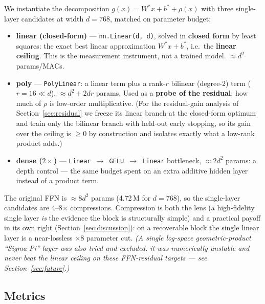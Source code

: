 \documentclass{article}
\begin{document}
We instantiate the decomposition $g(x) = W^{*}x + b^{*} + \rho(x)$ with three single-layer
candidates at width $d = 768$, matched on parameter budget:
\begin{itemize}
\item \textbf{linear (closed-form)} --- \texttt{nn.Linear(d, d)}, solved in \textbf{closed
  form} by least squares: the exact best linear approximation $W^{*}x + b^{*}$, i.e.\ the
  \textbf{linear ceiling}. This is the measurement instrument, not a trained model.
  $\approx d^2$ params/MACs.
\item \textbf{poly} --- \texttt{PolyLinear}: a linear term plus a rank-$r$ bilinear (degree-2)
  term ($r = 16 \ll d$), $\approx d^2 + 2dr$ params. Used as a \textbf{probe of the residual}:
  how much of $\rho$ is low-order multiplicative. (For the residual-gain analysis of
  Section~\ref{sec:residual} we freeze its linear branch at the closed-form optimum and train
  only the bilinear branch with held-out early stopping, so its gain over the ceiling is
  $\ge 0$ by construction and isolates exactly what a low-rank product adds.)
\item \textbf{dense ($2\times$)} --- \texttt{Linear $\to$ GELU $\to$ Linear} bottleneck,
  $\approx 2d^2$ params: a depth control --- the same budget spent on an extra additive
  hidden layer instead of a product term.
\end{itemize}
The original FFN is $\approx 8d^2$ params (4.72\,M for $d = 768$), so the single-layer
candidates are 4--8$\times$ compressions. Compression is both the lens (a high-fidelity
single layer \emph{is} the evidence the block is structurally simple) and a practical payoff
in its own right (Section~\ref{sec:discussion}): on a recoverable block the single linear
layer is a near-lossless $\times 8$ parameter cut. \emph{(A single log-space
geometric-product ``Sigma-Pi'' layer was also tried and excluded: it was numerically
unstable and never beat the linear ceiling on these FFN-residual targets --- see
Section~\ref{sec:future}.)}

\subsection{Metrics}
\label{sec:metrics}
\end{document}
